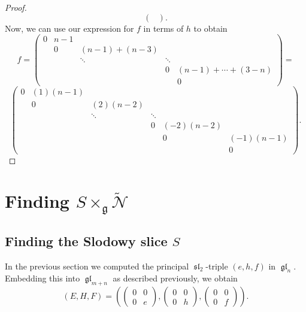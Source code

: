 \documentclass[12pt,psamsfonts]{article}
\DeclareMathOperator{\gl}{\mathfrak{gl}}
\DeclareMathOperator{\spl}{\mathfrak{sl}}
\begin{document}
\begin{proof}
\[\begin{pmatrix}
\end{pmatrix}.\]
Now, we can use our expression for \(f\) in terms of \(h\) to obtain
\[f = \begin{pmatrix}
    0 & n - 1 \\
    & 0 & (n - 1) + (n - 3) \\
    & & \ddots & \ddots \\
    & & & 0 & (n - 1) + \cdots + (3 - n) \\
    & & & & 0
\end{pmatrix} = \]
\[\begin{pmatrix}
    0 & (1) (n - 1) \\
      & 0 & (2) (n - 2) \\
      & & \ddots & \ddots & \\
    & & & 0 & (-2)(n - 2) \\
    & & & & 0 & (-1)(n - 1)\\
    & &  & & & 0
\end{pmatrix}.\]
\end{proof}

\section{Finding \texorpdfstring{\(S \times_\mathfrak{g} \widetilde{\mathcal{N}}\)}{S x\_g N}}\label{find_sxn}
\subsection{Finding the Slodowy slice \texorpdfstring{\(S\)}{S}}
In the previous section we computed the principal \(\spl_2\)-triple \((e, h, f)\) in \(\gl_n\).
Embedding this into \(\gl_{m + n}\) as described previously, we obtain
\[(E, H, F) = \left(\begin{pmatrix}0 & 0 \\0 & e\end{pmatrix}, \begin{pmatrix}0 & 0 \\0 & h\end{pmatrix}, \begin{pmatrix}0 & 0 \\0 & f\end{pmatrix}\right).\]
\end{document}
